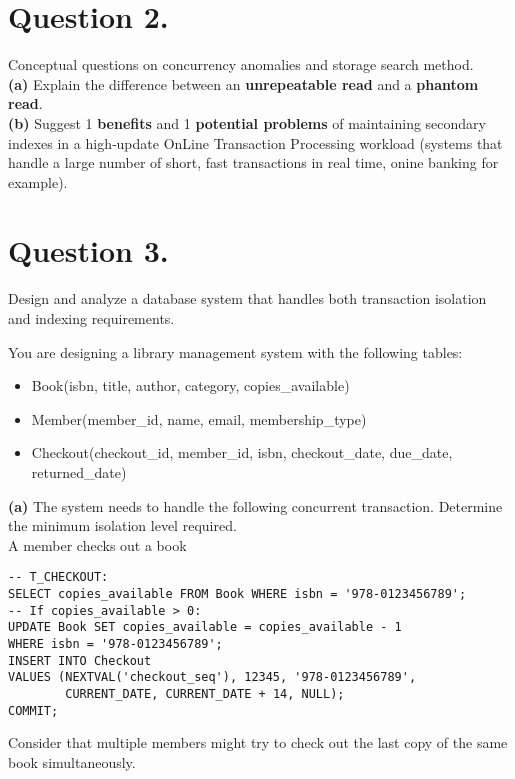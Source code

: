 \documentclass{article}
\begin{document}
\newpage
\section*{Question 2.}

Conceptual questions on concurrency anomalies and storage search method.\\

\textbf{(a)} Explain the difference between an \textbf{unrepeatable read} 
and a \textbf{phantom read}. \\

\textbf{(b)} Suggest 1 \textbf{benefits} and 1 \textbf{potential problems} of maintaining 
secondary indexes in a high‐update 
OnLine Transaction Processing workload (systems that handle a large number of short, 
fast transactions in real time, onine banking for example).\\

\newpage
\section*{Question 3.}
Design and analyze a database system that handles both transaction isolation and 
indexing requirements.

You are designing a library management system with the following tables:
\begin{itemize}
    \item Book(isbn, title, author, category, copies\_available)
    \item Member(member\_id, name, email, membership\_type)
    \item Checkout(checkout\_id, member\_id, isbn, checkout\_date, due\_date, 
    returned\_date)
\end{itemize}

\textbf{(a)} The system needs to handle the following concurrent transaction. 
Determine the minimum isolation level required.\\

A member checks out a book
\begin{verbatim}
-- T_CHECKOUT:
SELECT copies_available FROM Book WHERE isbn = '978-0123456789';
-- If copies_available > 0:
UPDATE Book SET copies_available = copies_available - 1 
WHERE isbn = '978-0123456789';
INSERT INTO Checkout 
VALUES (NEXTVAL('checkout_seq'), 12345, '978-0123456789', 
        CURRENT_DATE, CURRENT_DATE + 14, NULL);
COMMIT;
\end{verbatim}

Consider that multiple members might try to check out the last copy of the same book 
simultaneously.\\
\end{document}
